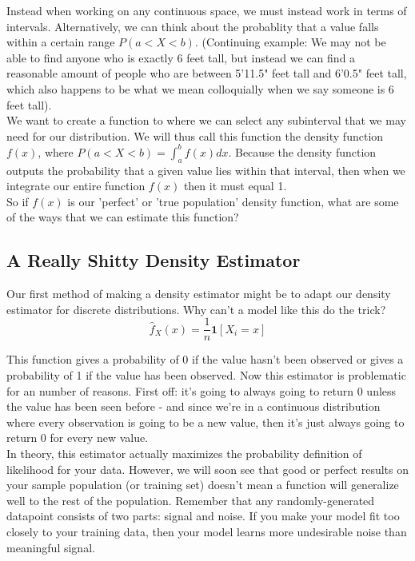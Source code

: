 \documentclass[12pt]{article}
\begin{document}
Instead when working on any continuous space, we must instead work in terms of intervals. Alternatively, we can think about the probablity that a value falls within a certain range $P(a < X < b)$. (Continuing example: We may not be able to find anyone who is exactly 6 feet tall, but instead we can find a reasonable amount of people who are between 5'11.5" feet tall and 6'0.5" feet tall, which also happens to be what we mean colloquially when we say someone is 6 feet tall). \\

We want to create a function to where we can select any subinterval that we may need for our distribution. We will thus call this function the density function $f(x)$, where $P(a < X < b) = \int_{a}^{b} f(x) dx$. Because the density function outputs the probability that a given value lies within that interval, then when we integrate our entire function $f(x)$ then it must equal 1. \\

So if $f(x)$ is our 'perfect' or 'true population' density function, what are some of the ways that we can estimate this function? \\

\subsection{A Really Shitty Density Estimator}
Our first method of making a density estimator might be to adapt our density estimator for discrete distributions. Why can't a model like this do the trick?
$$\hat{f}_X(x) = \frac{1}{n} \mathbf{1}[ X_i = x ]$$

This function gives a probability of 0 if the value hasn't been observed or gives a probability of 1 if the value has been observed. Now this estimator is problematic for an number of reasons. First off: it's going to always going to return 0 unless the value has been seen before - and since we're in a continuous distribution where every observation is going to be a new value, then it's just always going to return 0 for every new value. \\

In theory, this estimator actually maximizes the probability definition of likelihood for your data. However, we will soon see that good or perfect results on your sample population (or training set) doesn't mean a function will generalize well to the rest of the population. Remember that any randomly-generated datapoint consists of two parts: signal and noise. If you make your model fit too closely to your training data, then your model learns more undesirable noise than meaningful signal. \\
\end{document}
